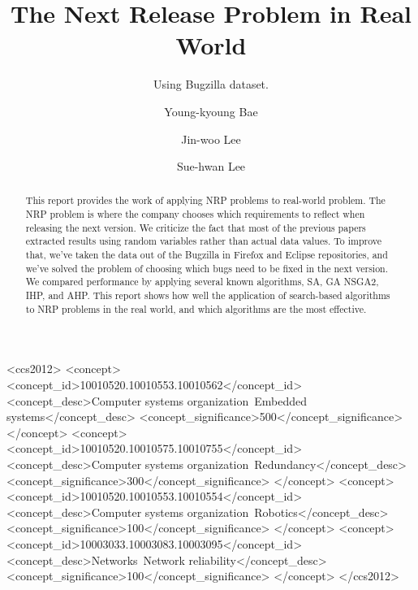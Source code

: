 \documentclass[sigconf]{acmart}
\begin{document}
\title{The Next Release Problem in Real World}
\subtitle{Using Bugzilla dataset.}


\author{Young-kyoung Bae}


\author{Jin-woo Lee}

\author{Sue-hwan Lee}

\begin{abstract}
This report provides the work of applying NRP problems to real-world problem. The NRP problem is where the company chooses which requirements to reflect when releasing the next version. We criticize the fact that most of the previous papers extracted results using random variables rather than actual data values. To improve that, we've taken the data out of the Bugzilla in Firefox and Eclipse repositories, and we've solved the problem of choosing which bugs need to be fixed in the next version. We compared performance by applying several known algorithms, SA, GA NSGA2, IHP, and AHP. This report shows how well the application of search-based algorithms to NRP problems in the real world, and which algorithms are the most effective.
\end{abstract}

%
%
\begin{CCSXML}
<ccs2012>
 <concept>
  <concept_id>10010520.10010553.10010562</concept_id>
  <concept_desc>Computer systems organization~Embedded systems</concept_desc>
  <concept_significance>500</concept_significance>
 </concept>
 <concept>
  <concept_id>10010520.10010575.10010755</concept_id>
  <concept_desc>Computer systems organization~Redundancy</concept_desc>
  <concept_significance>300</concept_significance>
 </concept>
 <concept>
  <concept_id>10010520.10010553.10010554</concept_id>
  <concept_desc>Computer systems organization~Robotics</concept_desc>
  <concept_significance>100</concept_significance>
 </concept>
 <concept>
  <concept_id>10003033.10003083.10003095</concept_id>
  <concept_desc>Networks~Network reliability</concept_desc>
  <concept_significance>100</concept_significance>
 </concept>
</ccs2012>
\end{CCSXML}


\maketitle





\end{document}
